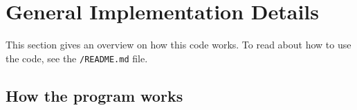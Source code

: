 \newpage



\section{General Implementation Details}


This section gives an overview on how this code works.
To read about how to use the code, see the \texttt{/README.md} file.



\subsection{How the program works}

